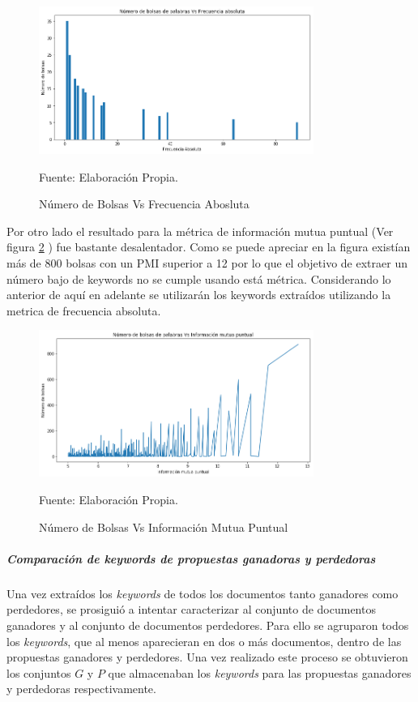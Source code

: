     \begin{figure}[H]
    \centering
    \includegraphics[width=0.8\textwidth]{figures/KeyWords/Umbral_FA.png}
    \caption{\label{fig:BowVsFA} Número de Bolsas Vs Frecuencia Abosluta} Fuente: Elaboración Propia.
    \end{figure}
    
    Por otro lado el resultado para la métrica de información mutua puntual (Ver figura \ref{fig:BowVsPMI} ) fue bastante desalentador. Como se puede apreciar en la figura existían más de 800 bolsas con un PMI superior a 12 por lo que el objetivo de extraer un número bajo de keywords no se cumple usando está métrica. 
    Considerando lo anterior de aquí en adelante se utilizarán los keywords extraídos utilizando la metrica de frecuencia absoluta. 
    
    \begin{figure}[H]
    \centering
    \includegraphics[width=0.8\textwidth]{figures/KeyWords/Umbral_PMI.png}
    \caption{\label{fig:BowVsPMI} Número de Bolsas Vs Información  Mutua Puntual} Fuente: Elaboración Propia.
    \end{figure}

\subparagraph{Comparación de keywords de propuestas ganadoras y perdedoras}
\subparagraph*{}
    Una vez extraídos los \textit{keywords} de todos los documentos tanto ganadores como perdedores, se prosiguió a intentar caracterizar al conjunto de documentos ganadores y al conjunto de documentos perdedores. Para ello se agruparon todos los \textit{keywords}, que al menos aparecieran en dos o más documentos, dentro de las propuestas ganadores y perdedores. Una vez realizado este proceso se obtuvieron los conjuntos $G$ y $P$ que almacenaban los \textit{keywords} para las propuestas ganadores y perdedoras respectivamente. 
    
